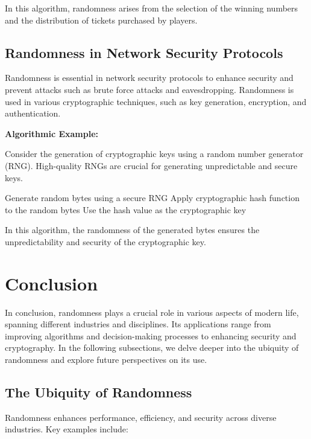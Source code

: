 \documentclass[12pt]{book} %
\begin{document}
In this algorithm, randomness arises from the selection of the winning numbers and the distribution of tickets purchased by players.

\subsection{Randomness in Network Security Protocols}

Randomness is essential in network security protocols to enhance security and prevent attacks such as brute force attacks and eavesdropping. Randomness is used in various cryptographic techniques, such as key generation, encryption, and authentication.

\textbf{Algorithmic Example:}

Consider the generation of cryptographic keys using a random number generator (RNG). High-quality RNGs are crucial for generating unpredictable and secure keys.
\FloatBarrier
\begin{algorithm}[H]
\caption{Key Generation with RNG}
\begin{algorithmic}[1]
\State Generate random bytes using a secure RNG
\State Apply cryptographic hash function to the random bytes
\State Use the hash value as the cryptographic key
\end{algorithmic}
\end{algorithm}
\FloatBarrier

In this algorithm, the randomness of the generated bytes ensures the unpredictability and security of the cryptographic key.


\section{Conclusion}

In conclusion, randomness plays a crucial role in various aspects of modern life, spanning different industries and disciplines. Its applications range from improving algorithms and decision-making processes to enhancing security and cryptography. In the following subsections, we delve deeper into the ubiquity of randomness and explore future perspectives on its use.

\subsection{The Ubiquity of Randomness}

Randomness enhances performance, efficiency, and security across diverse industries. Key examples include:
\end{document}
